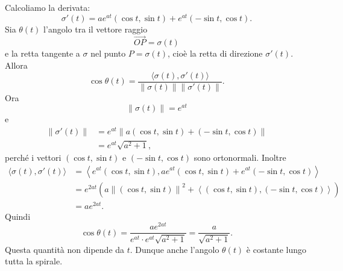 \documentclass[a4paper]{article}
\begin{document}
\begin{snippetproof}{}
    Calcoliamo la derivata:
    \[
        \sigma'(t)
        =
        ae^{at}(\cos t,\sin t)
        +
        e^{at}(-\sin t,\cos t).
    \]
    Sia \(\theta(t)\) l'angolo tra il vettore raggio
    \[
        \overrightarrow{OP}=\sigma(t)
    \]
    e la retta tangente a \(\sigma\) nel punto \(P=\sigma(t)\), cioè la retta di direzione \(\sigma'(t)\). Allora
    \[
        \cos\theta(t)
        =
        \frac{\langle\sigma(t),\sigma'(t)\rangle}{\left\|\sigma(t)\right\|\left\|\sigma'(t)\right\|}.
    \]
    Ora
    \[
        \left\|\sigma(t)\right\|=e^{at}
    \]
    e
    \begin{align*}
        \left\|\sigma'(t)\right\|
        &=
        e^{at}
        \left\|
            a(\cos t,\sin t)+(-\sin t,\cos t)
        \right\|\\
        &=
        e^{at}\sqrt{a^2+1},
    \end{align*}
    perché i vettori \((\cos t,\sin t)\) e \((-\sin t,\cos t)\) sono ortonormali. Inoltre
    \begin{align*}
        \langle\sigma(t),\sigma'(t)\rangle
        &=
        \left\langle
            e^{at}(\cos t,\sin t),
            ae^{at}(\cos t,\sin t)+e^{at}(-\sin t,\cos t)
        \right\rangle\\
        &=
        e^{2at}
        \left(
            a\left\|(\cos t,\sin t)\right\|^2
            +
            \left\langle
                (\cos t,\sin t),
                (-\sin t,\cos t)
            \right\rangle
        \right)\\
        &=
        ae^{2at}.
    \end{align*}
    Quindi
    \[
        \cos\theta(t)
        =
        \frac{ae^{2at}}{e^{at}\cdot e^{at}\sqrt{a^2+1}}
        =
        \frac{a}{\sqrt{a^2+1}}.
    \]
    Questa quantità non dipende da \(t\). Dunque anche l'angolo \(\theta(t)\) è costante lungo tutta la spirale.
\end{snippetproof}
\end{document}
